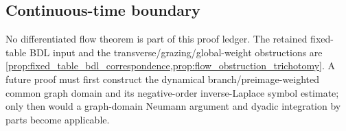 \subsection{Continuous-time boundary}

No differentiated flow theorem is part of this proof ledger.  The retained
fixed-table BDL input and the transverse/grazing/global-weight obstructions are
\cref{prop:fixed_table_bdl_correspondence,prop:flow_obstruction_trichotomy}.
A future proof must first construct the dynamical branch/preimage-weighted
common graph domain and its negative-order inverse-Laplace symbol estimate;
only then would a graph-domain Neumann argument and dyadic integration by
parts become applicable.
